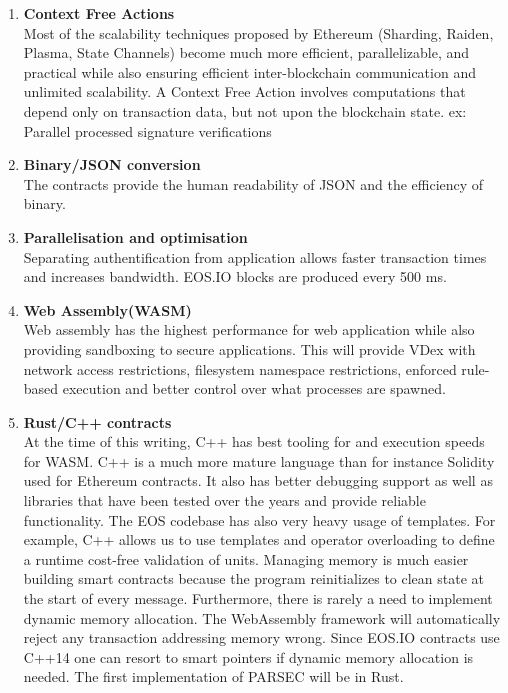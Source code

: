 \documentclass[]{article}
\begin{document}
	\begin{enumerate}
					
			\item \textbf{Context Free Actions} \\
		Most of the scalability techniques proposed by Ethereum (Sharding, Raiden, Plasma, State Channels) become much more efficient, parallelizable, and practical while also ensuring efficient inter-blockchain communication and unlimited scalability.
		A Context Free Action involves computations that depend only on transaction data, but not upon the blockchain state.
		ex: Parallel processed signature verifications\\
		
		\item\textbf{ Binary/JSON conversion} \\
		 The contracts provide the human readability of JSON and the efficiency of binary. \\
	
		\item \textbf{Parallelisation and optimisation\\ } 
		Separating authentification from application allows faster transaction times and increases bandwidth.
		EOS.IO blocks are produced every 500 ms.
		
	\item \textbf{Web Assembly(WASM)}   \\
	Web assembly has the highest performance for web application while also providing sandboxing to secure applications.
	This will provide VDex with network access restrictions,
	filesystem namespace restrictions, enforced rule-based execution and better control over what processes are spawned.
	
	\item \textbf{Rust/C++ contracts\\}
	At the time of this writing,
	C++ has best tooling for and execution speeds for WASM.
	C++ is a much more mature language than for instance Solidity used for Ethereum contracts.
	It also has better debugging support as well as libraries that have been tested over the years and provide reliable functionality. 
	The EOS codebase has also very heavy usage of templates.
	For example, C++ allows us to use templates and operator overloading to define a runtime cost-free validation of units.
	Managing memory is much easier building smart contracts because the
	program reinitializes to clean state at the start of every message. Furthermore, there is rarely a need to implement dynamic memory allocation. The WebAssembly framework will automatically reject any transaction addressing memory wrong.
	Since EOS.IO contracts use C++14 one can resort to smart pointers if dynamic memory allocation is needed.
	The first implementation of PARSEC will be in Rust.\cite{23}
	 	

\end{enumerate}
\end{document}
